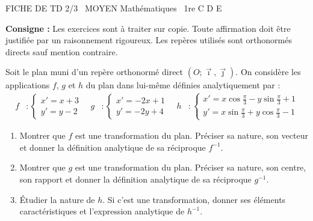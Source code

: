 \documentclass[11pt]{article}
\begin{document}
\begin{tcolorbox}[enhanced,colback=popink,colframe=popink,arc=10pt,boxrule=0pt,left=12pt,right=12pt,top=9pt,bottom=9pt]
{\color{white}\popxbold\small FICHE DE TD 2/3 \textbullet\ MOYEN \hfill Mathématiques \textbullet\ 1re C D E\par}
\end{tcolorbox}
\vspace{4pt}
\noindent\textbf{Consigne :} Les exercices sont à traiter sur copie. Toute affirmation doit être justifiée par un raisonnement rigoureux. Les repères utilisés sont orthonormés directs sauf mention contraire.

\begin{exercice}
Soit le plan muni d'un repère orthonormé direct $(O; \vec{\imath}, \vec{\jmath})$. On considère les applications $f$, $g$ et $h$ du plan dans lui-même définies analytiquement par :
\begin{align*}
f &: \begin{cases} x' = x + 3 \\ y' = y - 2 \end{cases} \quad
g &: \begin{cases} x' = -2x + 1 \\ y' = -2y + 4 \end{cases} \quad
h &: \begin{cases} x' = x \cos\frac{\pi}{3} - y \sin\frac{\pi}{3} + 1 \\ y' = x \sin\frac{\pi}{3} + y \cos\frac{\pi}{3} - 1 \end{cases}
\end{align*}
\begin{enumerate}
    \item Montrer que $f$ est une transformation du plan. Préciser sa nature, son vecteur et donner la définition analytique de sa réciproque $f^{-1}$.
    \item Montrer que $g$ est une transformation du plan. Préciser sa nature, son centre, son rapport et donner la définition analytique de sa réciproque $g^{-1}$.
    \item Étudier la nature de $h$. Si c'est une transformation, donner ses éléments caractéristiques et l'expression analytique de $h^{-1}$.
\end{enumerate}
\end{exercice}
\end{document}
